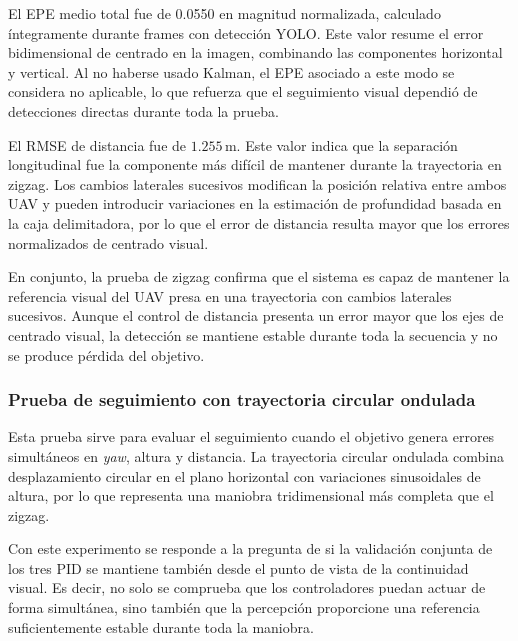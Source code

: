 \vspace{0.3cm}

El EPE medio total fue de 0.0550 en magnitud normalizada, calculado íntegramente durante frames con detección YOLO. Este valor resume el error bidimensional de centrado en la imagen, combinando las componentes horizontal y vertical. Al no haberse usado Kalman, el EPE asociado a este modo se considera no aplicable, lo que refuerza que el seguimiento visual dependió de detecciones directas durante toda la prueba.

\vspace{0.3cm}

El RMSE de distancia fue de $1.255\,\mathrm{m}$. Este valor indica que la separación longitudinal fue la componente más difícil de mantener durante la trayectoria en zigzag. Los cambios laterales sucesivos modifican la posición relativa entre ambos UAV y pueden introducir variaciones en la estimación de profundidad basada en la caja delimitadora, por lo que el error de distancia resulta mayor que los errores normalizados de centrado visual.

\vspace{0.3cm}

En conjunto, la prueba de zigzag confirma que el sistema es capaz de mantener la referencia visual del UAV presa en una trayectoria con cambios laterales sucesivos. Aunque el control de distancia presenta un error mayor que los ejes de centrado visual, la detección se mantiene estable durante toda la secuencia y no se produce pérdida del objetivo.

\subsubsection{Prueba de seguimiento con trayectoria circular ondulada}

Esta prueba sirve para evaluar el seguimiento cuando el objetivo genera errores simultáneos en \textit{yaw}, altura y distancia. La trayectoria circular ondulada combina desplazamiento circular en el plano horizontal con variaciones sinusoidales de altura, por lo que representa una maniobra tridimensional más completa que el zigzag.

\vspace{0.3cm}

Con este experimento se responde a la pregunta de si la validación conjunta de los tres PID se mantiene también desde el punto de vista de la continuidad visual. Es decir, no solo se comprueba que los controladores puedan actuar de forma simultánea, sino también que la percepción proporcione una referencia suficientemente estable durante toda la maniobra.

